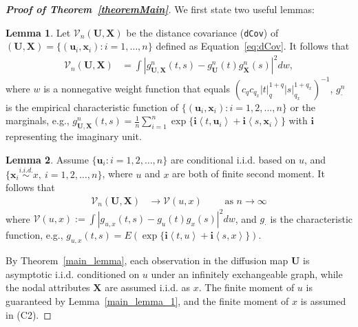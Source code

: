 \documentclass[12pt]{article}
\theoremstyle{definition}
\newtheorem{lemma}{Lemma}
\begin{document}
	\begin{proof}[\textbf{Proof of Theorem~\ref{theoremMain}}]
		
		We first state two useful lemmas:
		\begin{lemma}
			\label{lemma2}
			Let $\mathcal{V}_{n}(\mathbf{U}, \mathbf{X})$ be the distance covariance (\texttt{dCov}) of $(\mathbf{U}, \mathbf{X}) = \{  ( \mathbf{u}_{i}, \mathbf{x}_{i}  )  : i = 1, \ldots, n \}$ defined as Equation~\ref{eq:dCov}.
			It follows that
			\begin{eqnarray}
			\mathcal{V}_{n}(\mathbf{U},\mathbf{X}) &=   \int |g_{\mathbf{U},\mathbf{X}}^{n}(t,s)-g_{\mathbf{U}}^{n}(t)g_{\mathbf{X}}^{n}(s)|^{2} dw,
			\end{eqnarray}
			where $w$ is a nonnegative weight function that equals $(c_{q}c_{q_{x}}|t|_{q}^{1+q}|s|_{q_{x}}^{1+q_{x}})^{-1}$, $g_{\cdot}^{n}$ is the empirical characteristic function of $\{(\mathbf{u}_{i},\mathbf{x}_{i}) : i=1,2,...,n\}$ or the marginals, e.g., $g_{\mathbf{U},\mathbf{X}}^{n}(t,s)=\frac{1}{n}\sum_{i=1}^{n}\exp\{\textbf{i} \left\langle t,\mathbf{u}_{i} \right\rangle+\textbf{i} \left\langle s,\mathbf{x}_{i} \right\rangle\}$ with $\textbf{i}$ representing the imaginary unit.
		\end{lemma}
		
		\begin{lemma}
			\label{lemma3}
			Assume $\{ \mathbf{u}_{i} : i = 1,2, \ldots, n \}$ are conditional i.i.d. based on $u$, and $\{\mathbf{x}_{i} \stackrel{i.i.d.}{\sim} x,~i = 1, 2, \ldots, n\}$, where $u$ and $x$ are both of finite second moment. It follows that
			\begin{eqnarray}
			\mathcal{V}_{n}(\mathbf{U},\mathbf{X}) &\longrightarrow \mathcal{V}(u,x) \quad \quad \mbox{ as } n \rightarrow \infty
			\label{eq:conv1}
			\end{eqnarray}
			where $\mathcal{V} (u,x) := \int | g_{u,x}(t,s) - g_{u}(t) g_{x}(s) |^2 dw$, and $g_{\cdot}$ is the characteristic function, e.g., $g_{u,x}(t,s) = E(\exp\{\textbf{i} \left\langle t,u \right\rangle  +\textbf{i} \left\langle  s,x\right\rangle \})$.
		\end{lemma}
		
		By Theorem~\ref{main_lemma}, each observation in the diffusion map $\mathbf{U}$ is asymptotic i.i.d. conditioned on $u$ under an infinitely exchangeable graph, while the nodal attributes $\mathbf{X}$ are assumed i.i.d. as $x$. The finite moment of $u$ is guaranteed by Lemma~\ref{main_lemma_1}, and the finite moment of $x$ is assumed in (C2).
		

\end{proof}
\end{document}
